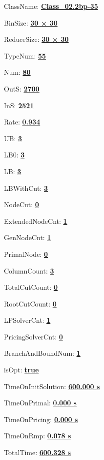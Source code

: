 \documentclass[11pt]{article}
\begin{document}
\pagestyle{empty}


ClassName: \underline{\textbf{Class_02.2bp-35}}
\par
BinSize: \underline{\textbf{30 × 30}}
\par
ReduceSize: \underline{\textbf{30 × 30}}
\par
TypeNum: \underline{\textbf{55}}
\par
Num: \underline{\textbf{80}}
\par
OutS: \underline{\textbf{2700}}
\par
InS: \underline{\textbf{2521}}
\par
Rate: \underline{\textbf{0.934}}
\par
UB: \underline{\textbf{3}}
\par
LB0: \underline{\textbf{3}}
\par
LB: \underline{\textbf{3}}
\par
LBWithCut: \underline{\textbf{3}}
\par
NodeCut: \underline{\textbf{0}}
\par
ExtendedNodeCnt: \underline{\textbf{1}}
\par
GenNodeCnt: \underline{\textbf{1}}
\par
PrimalNode: \underline{\textbf{0}}
\par
ColumnCount: \underline{\textbf{3}}
\par
TotalCutCount: \underline{\textbf{0}}
\par
RootCutCount: \underline{\textbf{0}}
\par
LPSolverCnt: \underline{\textbf{1}}
\par
PricingSolverCnt: \underline{\textbf{0}}
\par
BranchAndBoundNum: \underline{\textbf{1}}
\par
isOpt: \underline{\textbf{true}}
\par
TimeOnInitSolution: \underline{\textbf{600.000 s}}
\par
TimeOnPrimal: \underline{\textbf{0.000 s}}
\par
TimeOnPricing: \underline{\textbf{0.000 s}}
\par
TimeOnRmp: \underline{\textbf{0.078 s}}
\par
TotalTime: \underline{\textbf{600.328 s}}
\par
\newpage
\end{document}
